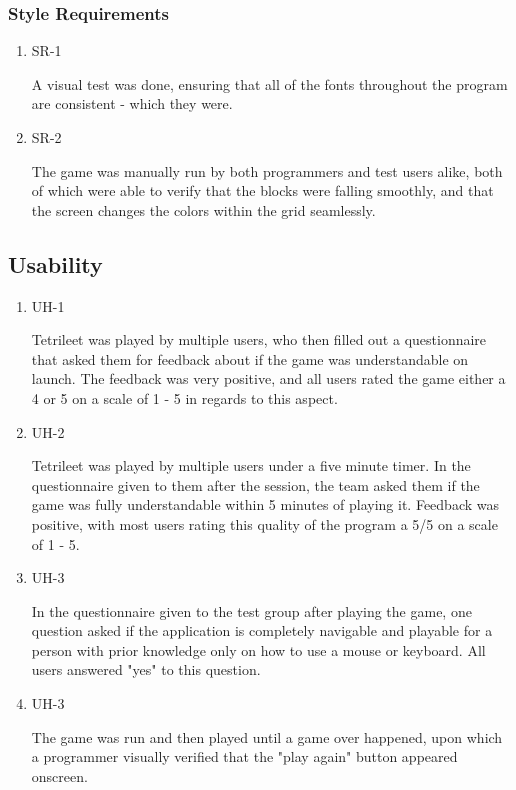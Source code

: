 \documentclass[12pt, titlepage]{article}
\begin{document}
\subsubsection{Style Requirements}

\begin{enumerate}

\item{SR-1\\}

A visual test was done, ensuring that all of the fonts throughout the program are consistent - which they were. 

\item{SR-2\\}

The game was manually run by both programmers and test users alike, both of which were able to verify that the blocks were falling smoothly, and that the screen changes the colors within the grid seamlessly.
\end{enumerate}

\subsection{Usability}
\begin{enumerate}

\item{UH-1\\}

Tetrileet was played by multiple users, who then filled out a questionnaire that asked them for feedback about if the game was understandable on launch. The feedback was very positive, and all users rated the game either a 4 or 5 on a scale of 1 - 5 in regards to this aspect.

\item{UH-2\\}

Tetrileet was played by multiple users under a five minute timer. In the questionnaire given to them after the session, the team asked them if the game was fully understandable within 5 minutes of playing it. Feedback was positive, with most users rating this quality of the program a 5/5 on a scale of 1 - 5.

\item{UH-3\\}

In the questionnaire given to the test group after playing the game, one question asked if the application is completely navigable and playable for a person with prior knowledge only on how to use a mouse or keyboard. All users answered "yes" to this question.

\item{UH-3\\}

The game was run and then played until a game over happened, upon which a programmer visually verified that the "play again" button appeared onscreen.

\end{enumerate}
\end{document}
